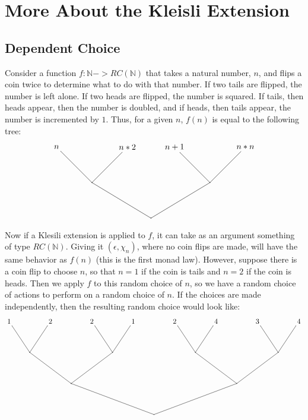 
\section{More About the Kleisli Extension}

\subsection{Dependent Choice}

Consider a function $f:\mathbb{N}->RC(\mathbb{N})$ that takes a natural number, $n$, and flips a coin twice to determine what to do with that number.  If two tails are flipped, the number is left alone.  If two heads are flipped, the number is squared.  If tails, then heads appear, then the number is doubled, and if heads, then tails appear, the number is incremented by $1$.  Thus, for a given $n$, $f(n)$ is equal to the following tree:
\[
\begin{xy}
(0,30)*+{n} = "v4";%
(30,30)*+{n*2} = "v5";%
(50,30)*+{n+1} = "v6";%
(80,30)*+{n*n} = "v7";%
(15,15)*{} = "v8";%
(65,15)*{} = "v9";%
(40,0)*{} = "v10";%
{\ar@{-} "v9"; "v6"};%
{\ar@{-} "v9"; "v7"};%
{\ar@{-} "v8"; "v5"};%
{\ar@{-} "v8"; "v4"};%
{\ar@{-} "v10"; "v8"};%
{\ar@{-} "v10"; "v9"};
\end{xy}
\]

Now if a Klesili extension is applied to $f$, it can take as an argument something of type $RC(\mathbb{N})$.  Giving it $(\epsilon, \chi_n)$, where no coin flips are made, will have the same behavior as $f(n)$ (this is the first monad law).  However, suppose there is a coin flip to choose $n$, so that $n=1$ if the coin is tails and $n=2$ if the coin is heads.  Then we apply $f$ to this random choice of $n$, so we have a random choice of actions to perform on a random choice of $n$.  If the choices are made independently, then the resulting random choice would look like:
\[
\begin{xy}
(0,45)*+{1} = "v1";%
(20,45)*+{2} = "v2";%
(40,45)*+{2} = "v3";%
(60,45)*+{1} = "v4";%
(80,45)*+{2} = "v5";%
(100,45)*+{4} = "v6";%
(120,45)*+{3} = "v7";%
(140,45)*+{4} = "v8";%
(10,30)*{} = "v9";%
(50,30)*{} = "v10";%
(90,30)*{} = "v11";%
(130,30)*{} = "v12";%
(30,15)*{} = "v13";%
(110,15)*{} = "v14";%
(70,0)*{} = "v15";%
{\ar@{-} "v9"; "v1"};%
{\ar@{-} "v9"; "v2"};%
{\ar@{-} "v3"; "v10"};%
{\ar@{-} "v10"; "v4"};%
{\ar@{-} "v11"; "v5"};%
{\ar@{-} "v11"; "v6"};%
{\ar@{-} "v12"; "v7"};%
{\ar@{-} "v12"; "v8"};%
{\ar@{-} "v13"; "v9"};%
{\ar@{-} "v13"; "v10"};%
{\ar@{-} "v14"; "v11"};%
{\ar@{-} "v14"; "v12"};%
{\ar@{-} "v15"; "v13"};%
{\ar@{-} "v15"; "v14"};%
\end{xy}
\]

